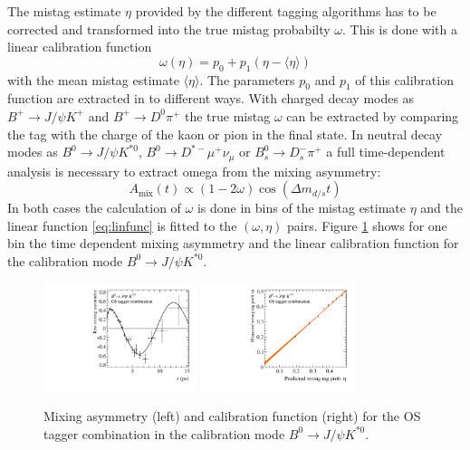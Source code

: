 \documentclass{PoS}
\begin{document}
The mistag estimate $\eta$ provided by the different tagging algorithms has to be corrected and transformed into the true mistag probabilty $\omega$. This is done with a linear calibration function
\begin{equation}
\omega(\eta)=p_0+p_1\left(\eta-\langle\eta\rangle\right)\label{eq:linfunc}
\end{equation}
with the mean mistag estimate $\langle\eta\rangle$. The parameters $p_0$ and $p_1$ of this calibration function are extracted in to different ways. With charged decay modes as $B^+\to J\!/\!\psi K^+$ and $B^+\to D^0\pi^+$ the true mistag $\omega$ can be extracted by comparing the tag with the charge of the kaon or pion in the final state. In neutral decay modes as $B^0\to J\!/\!\psi K^{*0}$, $B^0\to D^{*-}\mu^+\nu_\mu$ or $B_s^0\to D_s^-\pi^+$ a full time-dependent analysis is necessary to extract omega from the mixing asymmetry:
\begin{equation}
A_\text{mix}(t)\propto\left(1-2\omega\right)\cos\left(\Delta m_{d/s} t\right)
\end{equation}
In both cases the calculation of $\omega$ is done in bins of the mistag estimate $\eta$ and the linear function \ref{eq:linfunc} is fitted to the $(\omega,\eta)$ pairs. Figure \ref{fig:calibration} shows for one bin the time dependent mixing asymmetry and the linear calibration function for the calibration mode $B^0\to J\!/\!\psi K^{*0}$. 
\begin{figure}[htbp]
	\begin{center}
		\includegraphics[width=0.4\textwidth, angle=0]{figs/KstAsym.pdf}
		\includegraphics[width=0.4\textwidth, angle=0]{figs/Bd2JpsiKst-Kst-OST-8ScalingFunction_raw.pdf}
		\caption{Mixing asymmetry (left) and calibration function (right) for the OS tagger combination in the calibration mode $B^0\to J\!/\!\psi K^{*0}$.}
		\label{fig:calibration}
	\end{center}
\end{figure}
\end{document}
